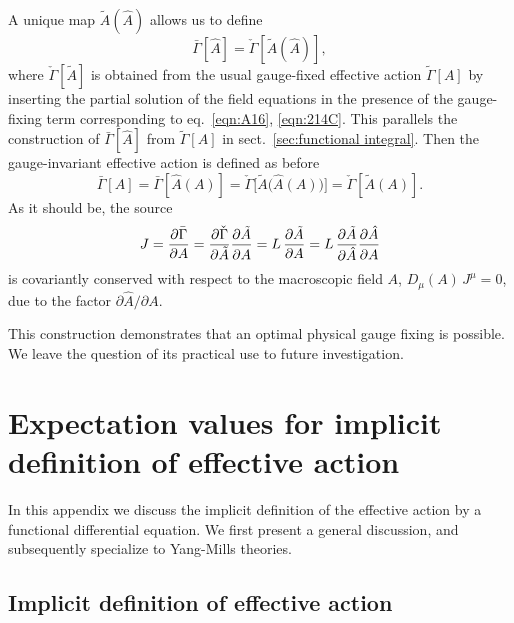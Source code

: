 \documentclass[twocolumn,aps,prd,amsmath,amssymb,preprintnumbers,longbibliography]{revtex4-1}
\numberwithin{equation}{section}
\begin{document}
\begin{appendices}
A unique map $\tilde{A}(\hat{A})$ allows us to define
\begin{equation}\label{eqn:OG3}
	\bar\Gamma[\hat{A}]
	= \check\Gamma[\tilde{A}(\hat{A})],
\end{equation}
where $\check\Gamma[\tilde{A}]$ is obtained from the usual gauge-fixed effective action $\tilde\Gamma[A]$ by inserting the partial solution of the field equations in the presence of the gauge-fixing term corresponding to eq.~\eqref{eqn:A16}, \eqref{eqn:214C}. This parallels the construction of $\bar\Gamma[\hat{A}]$ from $\tilde\Gamma[A]$ in sect.~\ref{sec:functional integral}. Then the gauge-invariant effective action is defined as before
\begin{equation}\label{eqn:OG4}
	\bar\Gamma[A]
	= \bar\Gamma[\hat{A}(A)]
	= \check\Gamma\bigl[\tilde{A}\bigl(\hat{A}(A)\bigr)\bigr]
	= \check\Gamma[\tilde{A}(A)].
\end{equation}
As it should be, the source
\begin{equation}\label{eqn:OG5}
	J
	= \frac{\partial \bar\Gamma}{\partial A}
	= \frac{\partial \check\Gamma}{\partial \tilde{A}} \frac{\partial \tilde{A}}{\partial A\vphantom{\tilde{A}}}
	= L \, \frac{\partial \tilde{A}}{\partial A}
	= L \, \frac{\partial \tilde{A}}{\partial \hat{A}} \frac{\partial \hat{A}}{\partial A\vphantom{\tilde{A}}}
\end{equation}
is covariantly conserved with respect to the macroscopic field $A$, $D_\mu(A) \, J^\mu = 0$, due to the factor $\partial \hat{A}/\partial A$.

This construction demonstrates that an optimal physical gauge fixing is possible. We leave the question of its practical use to future investigation.



\section{Expectation values for implicit definition of effective action}
\label{app:expectation values}

In this appendix we discuss the implicit definition of the effective action by a functional differential equation. We first present a general discussion, and subsequently specialize to Yang-Mills theories.


\subsection{Implicit definition of effective action}


\end{appendices}
\end{document}
